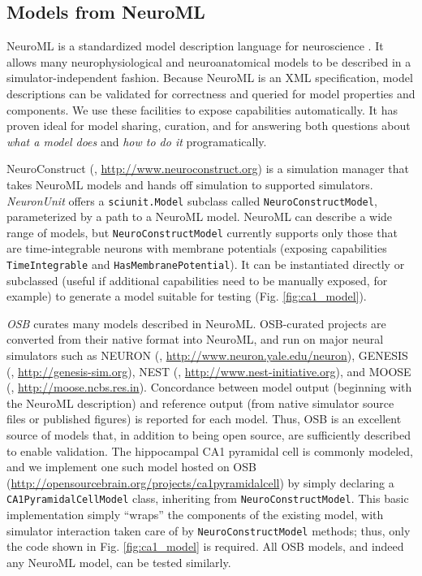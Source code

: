 \documentclass{frontiersSCNS}
\let\verbx\lstinline
\begin{document}
\subsection{Models from NeuroML}\label{sec:neuroml_models}
NeuroML is a standardized model description language for neuroscience \citep{gleeson_neuroml:_2010}. 
It allows many neurophysiological and neuroanatomical models to be described in a simulator-independent fashion. 
Because NeuroML is an XML specification, model descriptions can be validated for correctness and queried for model properties and components. We use these facilities to expose capabilities automatically. 
It has proven ideal for model sharing, curation, and for answering both questions about \textit{what a model does} and \textit{how to do it} programatically.  

NeuroConstruct (\cite{gleeson_neuroconstruct:_2007}, \url{http://www.neuroconstruct.org}) is a simulation manager that takes NeuroML models and hands off simulation to supported simulators. 
\textit{NeuronUnit} offers a \verbx{sciunit.Model} subclass called \verbx{NeuroConstructModel}, parameterized by a path to a NeuroML model.  
NeuroML can describe a wide range of models, but \verbx{NeuroConstructModel} currently supports only those that are time-integrable neurons with membrane potentials (exposing capabilities \verbx{TimeIntegrable} and \verbx{HasMembranePotential}). 
It can be instantiated directly or subclassed (useful if additional capabilities need to be manually exposed, for example) to generate a model suitable for testing (Fig. \ref{fig:ca1_model}). 

\textit{OSB} curates many models described in NeuroML. 
OSB-curated projects are converted from their native format into NeuroML, and run on major neural simulators such as NEURON (\cite{carnevale_neuron_2006}, \url{http://www.neuron.yale.edu/neuron}), GENESIS (\cite{bower_genesis_2007}, \url{http://genesis-sim.org}), NEST (\cite{gewaltig_nest_2007}, \url{http://www.nest-initiative.org}), and MOOSE (\cite{ray_moose_2008}, \url{http://moose.ncbs.res.in}). 
Concordance between model output (beginning with the NeuroML description) and reference output (from native simulator source files or published figures) is reported for each model. 
Thus, OSB is an excellent source of models that, in addition to being open source, are sufficiently described to enable validation. 
The hippocampal CA1 pyramidal cell is commonly modeled, and we implement one such model hosted on OSB (\url{http://opensourcebrain.org/projects/ca1pyramidalcell}) by simply declaring a \verbx{CA1PyramidalCellModel} class, inheriting from \verbx{NeuroConstructModel}.  
This basic implementation simply ``wraps'' the components of the existing model, with simulator interaction taken care of by \verbx{NeuroConstructModel} methods; 
thus, only the code shown in Fig. \ref{fig:ca1_model} is required. 
All OSB models, and indeed any NeuroML model, can be tested similarly. 
\end{document}
